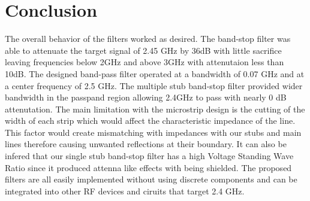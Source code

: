 \documentclass[letterpaper, 11pt, twocolumn]{article}
\begin{document}
\section{Conclusion}
The overall behavior of the filters worked as desired. The band-stop filter was able to attenuate the target signal of 2.45 GHz by 36dB with little sacrifice leaving frequencies below 2GHz and above 3GHz with attenutaion less than 10dB. The designed band-pass filter operated at a bandwidth of 0.07 GHz and at a center frequency of 2.5 GHz. The multiple stub band-stop filter provided wider bandwidth in the passpand region allowing 2.4GHz to pass with nearly 0 dB attenutation. The main limitation with the microstrip design is the cutting of the width of each strip which would affect the characteristic impedance of the line. This factor would create mismatching with impedances with our stubs and main lines therefore causing unwanted reflections at their boundary. It can also be infered that our single stub band-stop filter has a high Voltage Standing Wave Ratio since it produced attenna like effects with being shielded. The proposed filters are all easily implemented without using discrete components and can be integrated into other RF devices and ciruits that target 2.4 GHz.
\end{document}
